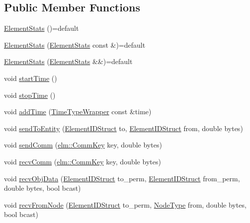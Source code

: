 \subsection*{Public Member Functions}
\begin{DoxyCompactItemize}
\item 
\hyperlink{structvt_1_1elm_1_1_element_stats_a9a07ef20788a8b9f4f0b8633352cb931}{Element\+Stats} ()=default
\item 
\hyperlink{structvt_1_1elm_1_1_element_stats_afa1b9b94a8d93abc67c8be727f1fab44}{Element\+Stats} (\hyperlink{structvt_1_1elm_1_1_element_stats}{Element\+Stats} const \&)=default
\item 
\hyperlink{structvt_1_1elm_1_1_element_stats_a0c8aacbfe7048bc11abc78887736415a}{Element\+Stats} (\hyperlink{structvt_1_1elm_1_1_element_stats}{Element\+Stats} \&\&)=default
\item 
void \hyperlink{structvt_1_1elm_1_1_element_stats_a58f57dbc6d180338d53a8acd8ba29712}{start\+Time} ()
\item 
void \hyperlink{structvt_1_1elm_1_1_element_stats_ac3ec6239fc848a98d7c9aba6e0331764}{stop\+Time} ()
\item 
void \hyperlink{structvt_1_1elm_1_1_element_stats_a17db2e465f6b06239f0b0ceb4e7d9f42}{add\+Time} (\hyperlink{structvt_1_1_time_type_wrapper}{Time\+Type\+Wrapper} const \&time)
\item 
void \hyperlink{structvt_1_1elm_1_1_element_stats_af9452e09210ecdfae2b1759ee1b1fb91}{send\+To\+Entity} (\hyperlink{structvt_1_1elm_1_1_element_i_d_struct}{Element\+I\+D\+Struct} to, \hyperlink{structvt_1_1elm_1_1_element_i_d_struct}{Element\+I\+D\+Struct} from, double bytes)
\item 
void \hyperlink{structvt_1_1elm_1_1_element_stats_a43ee151dce76d5480f2121e8b2deaac2}{send\+Comm} (\hyperlink{structvt_1_1elm_1_1_comm_key}{elm\+::\+Comm\+Key} key, double bytes)
\item 
void \hyperlink{structvt_1_1elm_1_1_element_stats_a5ec30d76df833e12cebf39fc25eb514a}{recv\+Comm} (\hyperlink{structvt_1_1elm_1_1_comm_key}{elm\+::\+Comm\+Key} key, double bytes)
\item 
void \hyperlink{structvt_1_1elm_1_1_element_stats_aaf35c3797e1bce9710051a7fc5a46dc1}{recv\+Obj\+Data} (\hyperlink{structvt_1_1elm_1_1_element_i_d_struct}{Element\+I\+D\+Struct} to\+\_\+perm, \hyperlink{structvt_1_1elm_1_1_element_i_d_struct}{Element\+I\+D\+Struct} from\+\_\+perm, double bytes, bool bcast)
\item 
void \hyperlink{structvt_1_1elm_1_1_element_stats_a33b8bdd69b89776a08055fbd72979fd2}{recv\+From\+Node} (\hyperlink{structvt_1_1elm_1_1_element_i_d_struct}{Element\+I\+D\+Struct} to\+\_\+perm, \hyperlink{namespacevt_a866da9d0efc19c0a1ce79e9e492f47e2}{Node\+Type} from, double bytes, bool bcast)

\end{DoxyCompactItemize}
